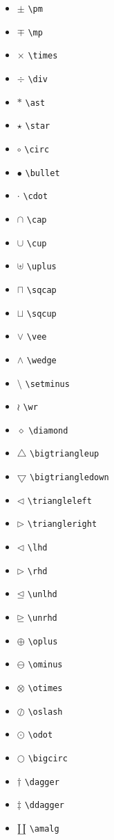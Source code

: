 \documentclass[twocolumn]{book}        %
\begin{document}
\begin{itemize}
    \item $\pm$ \texttt{\textbackslash pm}
    \item $\mp$ \texttt{\textbackslash mp}
    \item $\times$ \texttt{\textbackslash times}
    \item $\div$ \texttt{\textbackslash div}
    \item $\ast$ \texttt{\textbackslash ast}
    \item $\star$ \texttt{\textbackslash star}
    \item $\circ$ \texttt{\textbackslash circ}
    \item $\bullet$ \texttt{\textbackslash bullet}
    \item $\cdot$ \texttt{\textbackslash cdot}
    \item $\cap$ \texttt{\textbackslash cap}
    \item $\cup$ \texttt{\textbackslash cup}
    \item $\uplus$ \texttt{\textbackslash uplus}
    \item $\sqcap$ \texttt{\textbackslash sqcap}
    \item $\sqcup$ \texttt{\textbackslash sqcup}
    \item $\vee$ \texttt{\textbackslash vee}
    \item $\wedge$ \texttt{\textbackslash wedge}
    \item $\setminus$ \texttt{\textbackslash setminus}
    \item $\wr$ \texttt{\textbackslash wr}
    \item $\diamond$ \texttt{\textbackslash diamond}
    \item $\bigtriangleup$ \texttt{\textbackslash bigtriangleup}
    \item $\bigtriangledown$ \texttt{\textbackslash bigtriangledown}
    \item $\triangleleft$ \texttt{\textbackslash triangleleft}
    \item $\triangleright$ \texttt{\textbackslash triangleright}
    \item $\lhd$ \texttt{\textbackslash lhd}
    \item $\rhd$ \texttt{\textbackslash rhd}
    \item $\unlhd$ \texttt{\textbackslash unlhd}
    \item $\unrhd$ \texttt{\textbackslash unrhd}
    \item $\oplus$ \texttt{\textbackslash oplus}
    \item $\ominus$ \texttt{\textbackslash ominus}
    \item $\otimes$ \texttt{\textbackslash otimes}
    \item $\oslash$ \texttt{\textbackslash oslash}
    \item $\odot$ \texttt{\textbackslash odot}
    \item $\bigcirc$ \texttt{\textbackslash bigcirc}
    \item $\dagger$ \texttt{\textbackslash dagger}
    \item $\ddagger$ \texttt{\textbackslash ddagger}
    \item $\amalg$ \texttt{\textbackslash amalg}
\end{itemize}
\end{document}
